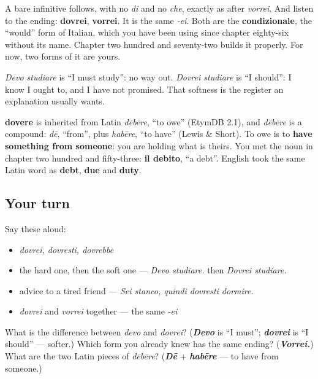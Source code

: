 A bare infinitive follows, with no \emph{di} and no \emph{che}, exactly as after \emph{vorrei}. And listen to the ending: \textbf{dovrei}, \textbf{vorrei}. It is the same \emph{-ei}. Both are the \textbf{condizionale}, the \textquotedblleft{}would\textquotedblright{} form of Italian, which you have been using since chapter eighty-six without its name. Chapter two hundred and seventy-two builds it properly. For now, two forms of it are yours.

\emph{Devo studiare} is \textquotedblleft{}I must study\textquotedblright{}: no way out. \emph{Dovrei studiare} is \textquotedblleft{}I should\textquotedblright{}: I know I ought to, and I have not promised. That softness is the register an explanation usually wants.

\begin{cousinweb}
\textbf{dovere} is inherited from Latin \emph{dēbēre}, \textquotedblleft{}to owe\textquotedblright{} (EtymDB 2.1), and \emph{dēbēre} is a compound: \emph{dē}, \textquotedblleft{}from\textquotedblright{}, plus \emph{habēre}, \textquotedblleft{}to have\textquotedblright{} (Lewis \& Short). To owe is to \textbf{have something from someone}: you are holding what is theirs. You met the noun in chapter two hundred and fifty-three: \textbf{il debito}, \textquotedblleft{}a debt\textquotedblright{}. English took the same Latin word as \textbf{debt}, \textbf{due} and \textbf{duty}.
\end{cousinweb}

\subsection*{Your turn}
Say these aloud:

\begin{itemize}
\raggedright
  \item \emph{dovrei, dovresti, dovrebbe}
  \item the hard one, then the soft one — \emph{Devo studiare.} then \emph{Dovrei studiare.}
  \item advice to a tired friend — \emph{Sei stanco, quindi dovresti dormire.}
  \item \emph{dovrei} and \emph{vorrei} together — the same \emph{-ei}
\end{itemize}

\begin{tcolorbox}[breakable,colback=teal!4,colframe=teal!35!black,title={Before you move on}]
What is the difference between \emph{devo} and \emph{dovrei}? (\emph{\textbf{Devo}} is \textquotedblleft{}I must\textquotedblright{}; \emph{\textbf{dovrei}} is \textquotedblleft{}I should\textquotedblright{} — softer.) Which form you already knew has the same ending? (\emph{\textbf{Vorrei.}}) What are the two Latin pieces of \emph{dēbēre}? (\emph{\textbf{Dē}} + \emph{\textbf{habēre}} — to have from someone.)
\end{tcolorbox}

